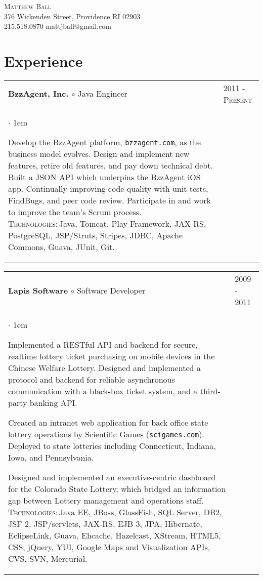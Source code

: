 \documentclass[10pt]{article}
\makeatletter
\newcommand{\employer}[4]
	{{ \begin{tabular}{l@{\hspace{5mm}}|p{30mm}}
	   \multicolumn{1}{l}{\textbf{#1 $\circ$ }#2}&\multicolumn{1}{p{30mm}}{\hspace{-3mm}\textsc{#3}} \\
	   \parbox{.825\textwidth}{#4 \vspace*{-4pt}}
	   \end{tabular} \vspace{4pt} }}
\newcommand{\contact}[4]
	{\begin{center}
		{\LARGE \scshape{#1}}\\
		#2\\
		\Telefon \hspace{0.5ex} #3 \hspace{1em} \Letter \hspace{0.5ex} #4
	\end{center}
	\vspace*{-8pt}}
\newenvironment{achievements}           %
	{\begin{list}{$\cdot$}{\topsep 0pt \itemsep 4pt \parsep 0pt \leftmargin 1em}
	 \linespread{1.05} \selectfont %
	}
	{\end{list}\vspace*{4pt}}
\def\kt{\vspace*{2pt}\\\textsc{Technologies:\,}}
\makeatother
\begin{document}
\contact{Matthew Ball}
{376 Wickenden Street, Providence RI 02903}
{215.518.0870}
{mattjball@gmail.com}

\section{Experience}
\employer{BzzAgent, Inc.}{Java Engineer}{2011 - Present}{
	\begin{achievements}
	
	\item{Develop the BzzAgent platform, \texttt{bzzagent.com}, as the business model evolves. Design and implement new features, retire old features, and pay down technical debt. Built a JSON API which underpins the BzzAgent iOS app. Continually improving code quality with unit tests, FindBugs, and peer code review. Participate in and work to improve the team's Scrum process. \kt Java, Tomcat, Play Framework, JAX-RS, PostgreSQL, JSP/Struts, Stripes, JDBC, Apache Commons, Guava, JUnit, Git.}
	
	\end{achievements}
}

\employer{Lapis Software}{Software Developer}{2009 - 2011}{
	\begin{achievements}
	
	\item{Implemented a RESTful API and backend for secure, realtime lottery ticket purchasing on mobile devices in the Chinese Welfare Lottery. Designed and implemented a protocol and backend for reliable asynchronous communication with a black-box ticket system, and a third-party banking API.}
	
\item{Created an intranet web application for back office state lottery operations by Scientific Games (\texttt{scigames.com}). Deployed to state lotteries including Connecticut, Indiana, Iowa, and Pennsylvania.}
	
\item{Designed and implemented an executive-centric dashboard for the Colorado State Lottery, which bridged an information gap between Lottery management and operations staff. \kt Java EE, JBoss, GlassFish, SQL Server, DB2, JSF 2, JSP/servlets, JAX-RS, EJB 3, JPA, Hibernate, EclipseLink, Guava, Ehcache, Hazelcast, XStream, HTML5, CSS, jQuery, YUI, Google Maps and Visualization APIs, CVS, SVN, Mercurial.}
	
	\end{achievements}
}
\end{document}
